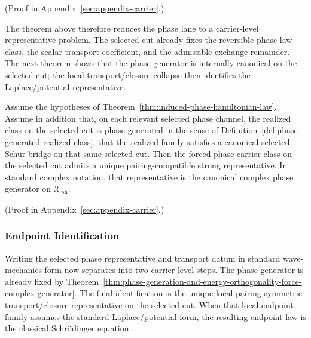 (Proof in Appendix~\ref{sec:appendix-carrier}.)

The theorem above therefore reduces the phase lane to a carrier-level
representative problem. The selected cut already fixes the reversible phase law
class, the scalar transport coefficient, and the admissible exchange
remainder. The next theorem shows that the phase generator is internally
canonical on the selected cut; the local transport/closure collapse then
identifies the Laplace/potential representative.

\begin{theorem}
\label{thm:phase-generation-and-energy-orthogonality-force-complex-generator}
Assume the hypotheses of
Theorem~\ref{thm:induced-phase-hamiltonian-law}. Assume in addition that, on
each relevant selected phase channel, the realized class on the selected cut
is phase-generated in the sense of
Definition~\ref{def:phase-generated-realized-class}, that the realized family
satisfies a canonical selected Schur bridge on that same selected cut. Then
the forced phase-carrier class on the selected cut admits a unique
pairing-compatible strong representative. In standard complex notation, that
representative is the canonical complex phase generator on
\(\mathcal X_{\mathrm{ph}}\).
\end{theorem}

(Proof in Appendix~\ref{sec:appendix-carrier}.)

\subsubsection{Endpoint Identification}

Writing the selected phase representative and transport datum in standard
wave-mechanics form now separates into two carrier-level steps. The phase
generator is already fixed by
Theorem~\ref{thm:phase-generation-and-energy-orthogonality-force-complex-generator}.
The final identification is the unique local pairing-symmetric
transport/closure representative on the selected cut. When that local endpoint
family assumes the standard Laplace/potential form, the resulting
endpoint law is the classical Schr\"odinger equation
\cite{Schrodinger1926,Stone1932}.

